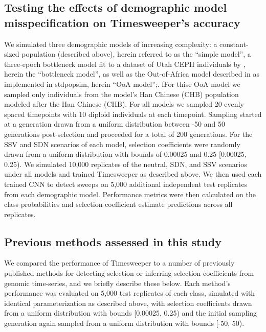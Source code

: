 \subsection{Testing the effects of demographic model misspecification on Timesweeper’s accuracy}

We simulated three demographic models of increasing complexity: a constant-sized population (described above), herein referred to as the “simple model”, a three-epoch bottleneck model fit to a dataset of Utah CEPH individuals by \cite{marthAlleleFrequencySpectrum2004}, herein the “bottleneck model”, as well as the Out-of-Africa model described in \cite{gutenkunstInferringJointDemographic2009} as implemented in stdpopsim, herein “OoA model”;. fFor thise OoA model we sampled only individuals from the model’s Han Chinese (CHB) population modeled after the Han Chinese (CHB). For all models we sampled 20 evenly spaced timepoints with 10 diploid individuals at each timepoint. Sampling started at a generation drawn from a uniform distribution between -50 and 50 generations post-selection and proceeded for a total of 200 generations. For the SSV and SDN scenarios of each model, selection coefficients were randomly drawn from a uniform distribution with bounds of 0.00025 and 0.25 [0.00025, 0.25). We simulated 10,000 replicates of the neutral, SDN, and SSV scenarios under all models and trained Timesweeper as described above. We then used each trained CNN to detect sweeps on 5,000 additional independent test replicates from each demographic model. Performance metrics were then calculated on the class probabilities and selection coefficient estimate predictions across all replicates. \\

\subsection{Previous methods assessed in this study} 

We compared the performance of Timesweeper to a number of previously published methods for detecting selection or inferring selection coefficients from genomic time-series, and we briefly describe these below. Each method’s performance was evaluated on 5,000 test replicates of each class, simulated with identical parameterization as described above, with selection coefficients drawn from a uniform distribution with bounds [0.00025, 0.25) and the initial sampling generation again sampled from a uniform distribution with bounds [-50, 50). \\

